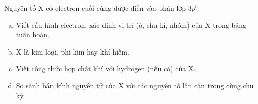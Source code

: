 	\begin{bt}%
		Nguyên tố  X có electron cuối cùng được điền vào phân lớp $3p^5$.
		\begin{enumerate}[a)]
			\item Viết cấu hình electron, xác định vị trí (ô, chu kì, nhóm) của X trong bảng tuần hoàn.
			\item X là kim loại, phi kim hay khí hiếm.
			\item Viết công thức hợp chất khí với hydrogen (nếu có) của X.
			\item So sánh  bán kính nguyên tử của X với các nguyên tố lân cận trong cùng chu kỳ.
		\end{enumerate}
	\end{bt}
